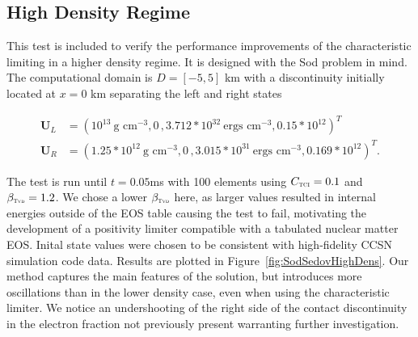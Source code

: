 \documentclass[onecolumn]{aastex62}
\newcommand{\TVD}{\textnormal{\tiny\textsc{Tvd}}}
\newcommand{\TCI}{\textnormal{\tiny\textsc{TCI}}}
\begin{document}
\subsection{High Density Regime}
This test is included to verify the performance improvements of the characteristic
limiting in a higher density regime. It is designed with the Sod problem in mind.
The computational domain is $D = [-5,5]$ km
with a discontinuity initially located at $x = 0$ km separating the left and right states

\begin{align}
  \mathbf{U}_{L} &= (10^{13}~\text{g~cm}^{-3}, 0\,, 3.712*10^{32}~\text{ergs~cm}^{-3}, 0.15*10^{12})^T\,\,\, \\
  \mathbf{U}_{R} &= (1.25*10^{12}~\text{g~cm}^{-3}, 0\, , 3.015*10^{31}~\text{ergs~cm}^{-3}, 0.169*10^{12})^T.
\end{align}

\noindent The test is run until $t = 0.05$ms with 100 elements
using $C_{\TCI} = 0.1$ and $\beta_{\TVD} = 1.2$. We chose a lower $\beta_{\TVD}$
here, as larger values resulted in internal energies outside of the
EOS table causing the test to fail, motivating the development of a
positivity limiter compatible with a tabulated nuclear matter EOS.
Inital state values were chosen to be consistent with
high-fidelity CCSN simulation code \chimera \citep{bruenn:2018} data.
Results are plotted in
Figure~\ref{fig:SodSedovHighDens}. Our method captures the main features
of the solution, but introduces more oscillations than in the lower density
case, even when using the characteristic limiter.
We notice an undershooting of the right side
of the contact discontinuity in the electron fraction not previously present
warranting further investigation.
\end{document}
